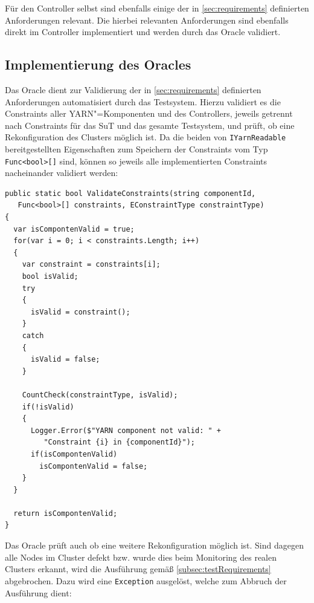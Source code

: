 Für den Controller selbst sind ebenfalls einige der in \cref{sec:requirements} definierten Anforderungen relevant.
Die hierbei relevanten Anforderungen sind ebenfalls direkt im Controller implementiert und werden durch das Oracle validiert.

\subsection{Implementierung des Oracles}
\label{subsec:oracleImpl}

Das Oracle dient zur Validierung der  in \cref{sec:requirements} definierten Anforderungen automatisiert durch das Testsystem.
Hierzu validiert es die Constraints aller \ac{YARN}"=Komponenten und des Controllers, jeweils getrennt nach Constraints für das \ac{SuT} und das gesamte Testsystem, und prüft, ob eine Rekonfiguration des Clusters möglich ist.
Da die beiden von \texttt{IYarnReadable} bereitgestellten Eigenschaften zum Speichern der Constraints vom Typ \texttt{Func<bool>[]} sind, können so jeweils alle implementierten Constraints nacheinander validiert werden:

\begin{lstlisting}[label=lst:oracleValidateConstraints,style=cs,
caption={[Validieren der Constraints durch das Oracle]
    Validieren der Constraints durch das Oracle.
    Die zu validierenden Constraints werden im Parameter \texttt{constraints} übergeben, der Parameter \texttt{constraintType} dient zu statistischen Zwecken in \texttt{CountCheck()}.}]
public static bool ValidateConstraints(string componentId,
   Func<bool>[] constraints, EConstraintType constraintType)
{
  var isCompontenValid = true;
  for(var i = 0; i < constraints.Length; i++)
  {
    var constraint = constraints[i];
    bool isValid;
    try
    {
      isValid = constraint();
    }
    catch
    {
      isValid = false;
    }
    
    CountCheck(constraintType, isValid);
    if(!isValid)
    {
      Logger.Error($"YARN component not valid: " +
         "Constraint {i} in {componentId}");
      if(isCompontenValid)
        isCompontenValid = false;
    }
  }
  
  return isCompontenValid;
}
\end{lstlisting}

Das Oracle prüft auch ob eine weitere Rekonfiguration möglich ist.
Sind dagegen alle Nodes im Cluster defekt bzw. wurde dies beim Monitoring des realen Clusters erkannt, wird die Ausführung gemäß \cref{subsec:testRequirements} abgebrochen.
Dazu wird eine \texttt{Exception} ausgelöst, welche zum Abbruch der Ausführung dient:

